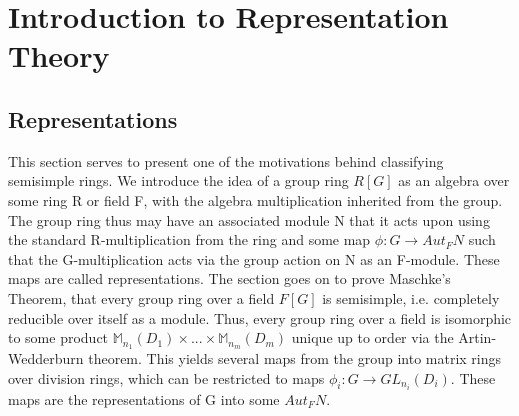 \documentclass{article}
\begin{document}
\pagebreak

\section{Introduction to Representation Theory}
\subsection{Representations}

This section serves to present one of the motivations behind classifying semisimple rings. We introduce the idea of a group ring $R[G]$ as an algebra over some ring R or field F, with the algebra multiplication inherited from the group. The group ring thus may have an associated module N that it acts upon using the standard R-multiplication from the ring and some map $\phi:G \to Aut_{F}N$ such that the G-multiplication acts via the group action on N as an F-module. These maps are called representations. The section goes on to prove Maschke's Theorem, that every group ring over a field $F[G]$ is semisimple, i.e. completely reducible over itself as a module. Thus, every group ring over a field is isomorphic to some product $\mathbb{M}_{n_{1}}(D_{1}) \times ... \times \mathbb{M}_{n_{m}}(D_{m})$ unique up to order via the Artin-Wedderburn theorem. This yields several maps from the group into matrix rings over division rings, which can be restricted to maps $\phi_{i}: G \to GL_{n_{i}}(D_{i})$. These maps are the representations of G into some $Aut_{F}N$. 
\end{document}
